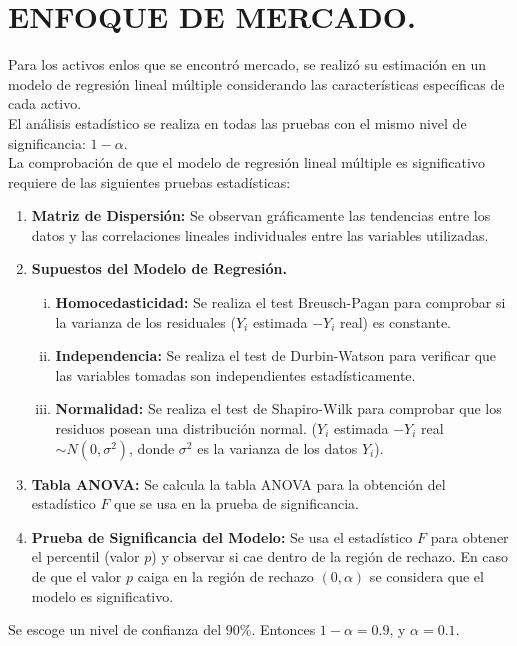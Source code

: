 \section{ENFOQUE DE MERCADO.} %

Para los activos enlos que se encontró mercado, se realizó su estimación en un modelo de regresión lineal múltiple considerando 
las características específicas de cada activo. \\ 
El análisis estadístico se realiza en todas las pruebas con el mismo nivel de 
significancia: \(1- \alpha\). \\[2mm]
La comprobación de que el modelo de regresión lineal múltiple es significativo
requiere de las siguientes pruebas estadísticas:
\begin{enumerate}
	\item \textbf{Matriz de Dispersión:} Se observan gráficamente las tendencias 
		entre los datos y las correlaciones lineales individuales entre las 
		variables utilizadas.
		\newpage
	\item \textbf{Supuestos del Modelo de Regresión.}
		\begin{enumerate}[i.]
			\item \textbf{Homocedasticidad:} Se realiza el test Breusch-Pagan para 
				comprobar si la varianza de los residuales (\(Y_i\) estimada
				\( - Y_i\) real) es constante.
			\item \textbf{Independencia:} Se realiza el test de Durbin-Watson para
				verificar que las variables tomadas son independientes estadísticamente.
			\item \textbf{Normalidad:} Se realiza el test de Shapiro-Wilk
				para comprobar que los residuos posean una distribución normal.
				(\(Y_i\) estimada \(- Y_i\) real \(\sim N(0, \sigma ^2)\), donde 
				\(\sigma ^ 2\) es la varianza de los datos \(Y_i\)).
		\end{enumerate}
	\item \textbf{Tabla ANOVA:} Se calcula la tabla ANOVA para la obtención del 
		estadístico \(F\) que se usa en la prueba de significancia.
	\item \textbf{Prueba de Significancia del Modelo:} Se usa el estadístico \(F\) 
		para obtener el percentil (valor \(p\))
		y observar si cae dentro de la región de rechazo.
		En caso de que el valor \(p\) caiga en la región de rechazo \((0, \alpha)\)
		se considera que el modelo es significativo.
\end{enumerate}
Se escoge un nivel de confianza del \(90\%\). Entonces \(1- \alpha =0.9\), y 
\(\alpha = 0.1\).

\espacio

